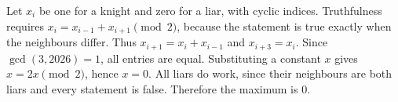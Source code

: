 Let $x_i$ be one for a knight and zero for a liar, with cyclic indices. Truthfulness requires $x_i=x_{i-1}+x_{i+1}\pmod2$, because the statement is true exactly when the neighbours differ. Thus $x_{i+1}=x_i+x_{i-1}$ and $x_{i+3}=x_i$. Since $\gcd(3,2026)=1$, all entries are equal. Substituting a constant $x$ gives $x=2x\pmod2$, hence $x=0$. All liars do work, since their neighbours are both liars and every statement is false. Therefore the maximum is $\boxed0$.
